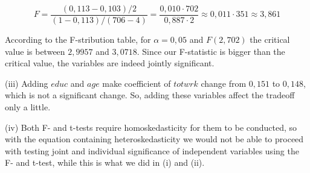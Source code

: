 \documentclass{article}
\begin{document}
$$F = \frac{(0,113 - 0,103) / 2}{(1 - 0,113) / (706 - 4)} = \frac{0,010 \cdot 702}{0,887 \cdot 2} \approx 0,011 \cdot 351 \approx 3,861$$

According to the F-stribution table, for $\alpha = 0,05$ and $F(2, 702)$ the critical value is between $2,9957$ and $3,0718$. Since our F-statistic is bigger than the critical value, the variables are indeed jointly significant. 

(iii) Adding $educ$ and $age$ make coefficient of $totwrk$ change from $0,151$ to $0,148$, which is not a significant change. So, adding these variables affect the tradeoff only a little. 

(iv) Both F- and t-tests require homoskedasticity for them to be conducted, so with the equation containing heteroskedasticity we would not be able to proceed with testing joint and individual significance of independent variables using the F- and t-test, while this is what we did in (i) and (ii). 
\end{document}
